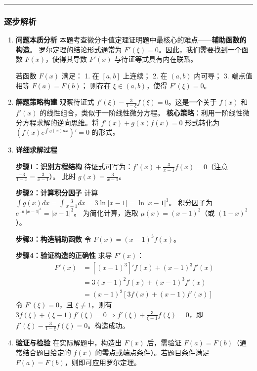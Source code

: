 \documentclass[UTF8]{ctexart}
\newenvironment{redenv}{\color{red}}{}
\newenvironment{detailedanalysis}{%
    \color{red}
    \begin{enumerate}[label=\textbf{第\arabic*步：}, leftmargin=*, align=left, itemsep=1.5ex]
}{%
    \end{enumerate}
}
\newcommand{\analysisrule}{\noindent\rule{\textwidth}{0.8pt}\vspace{-0.8em}}
\begin{document}
\begin{redenv}
\analysisrule
\subsubsection*{逐步解析}

\begin{detailedanalysis}
\item \textbf{问题本质分析}
本题考查微分中值定理证明题中最核心的难点——\textbf{辅助函数的构造}。
罗尔定理的结论形式通常为 $F'(\xi)=0$。因此，我们需要找到一个函数 $F(x)$，使得其导数 $F'(x)$ 与待证等式具有内在联系。
\begin{conceptbox}[罗尔定理回顾]
若函数 $F(x)$ 满足：
1. 在 $[a, b]$ 上连续；
2. 在 $(a, b)$ 内可导；
3. 端点值相等 $F(a)=F(b)$；
则存在 $\xi \in (a, b)$，使得 $F'(\xi) = 0$。
\end{conceptbox}

\item \textbf{解题策略构建}
观察待证式 $f'(\xi) - \frac{3}{1-\xi}f(\xi) = 0$。这是一个关于 $f(x)$ 和 $f'(x)$ 的线性组合，类似于一阶线性微分方程。
\textbf{核心策略}：利用一阶线性微分方程求解的逆向思维。将 $f'(x) + g(x)f(x) = 0$ 形式转化为 $(f(x)e^{\int g(x)dx})' = 0$ 的形式。

\item \textbf{详细求解过程}

\noindent\textbf{步骤1：识别方程结构}
待证式可写为：$f'(x) + \frac{3}{x-1}f(x) = 0$（注意 $\frac{-3}{1-x} = \frac{3}{x-1}$）。
此时 $g(x) = \frac{3}{x-1}$。

\noindent\textbf{步骤2：计算积分因子}
计算 $\int g(x) dx = \int \frac{3}{x-1} dx = 3\ln|x-1| = \ln|x-1|^3$。
积分因子为 $e^{\ln|x-1|^3} = |x-1|^3$。
为简化计算，选取 $\mu(x) = (x-1)^3$（或 $(1-x)^3$）。

\noindent\textbf{步骤3：构造辅助函数}
令 $F(x) = (x-1)^3 f(x)$。

\noindent\textbf{步骤4：验证构造的正确性}
求导 $F'(x)$：
\begin{align*}
F'(x) &= [(x-1)^3]' f(x) + (x-1)^3 f'(x) \\
&= 3(x-1)^2 f(x) + (x-1)^3 f'(x) \\
&= (x-1)^2 [3f(x) + (x-1)f'(x)]
\end{align*}
令 $F'(\xi)=0$，且 $\xi \neq 1$，则有 $3f(\xi) + (\xi-1)f'(\xi) = 0 \Rightarrow f'(\xi) + \frac{3}{\xi-1}f(\xi) = 0$，即 $f'(\xi) - \frac{3}{1-\xi}f(\xi) = 0$。构造成功。

\item \textbf{验证与检验}
在实际解题中，构造出 $F(x)$ 后，需验证 $F(a)=F(b)$（通常结合题目给定的 $f(x)$ 的零点或端点条件）。若题目条件满足 $F(a)=F(b)$，则即可应用罗尔定理。


\end{detailedanalysis}
\end{redenv}
\end{document}

